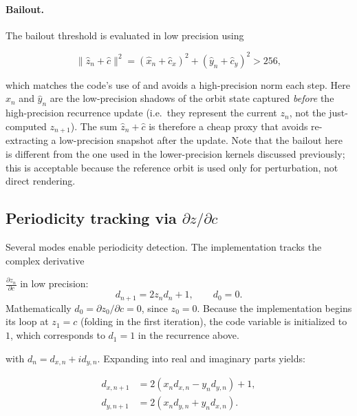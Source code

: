 \paragraph{Bailout.}

The bailout threshold is evaluated in low precision using

\begin{equation}
  \|\hat{z}_n + \hat{c}\|^2 = (\hat{x}_n + \hat{c}_x)^2 + (\hat{y}_n + \hat{c}_y)^2 > 256,
\end{equation}

which matches the code's use of  and avoids a high-precision
norm each step.  Here \(\hat{x}_n\) and \(\hat{y}_n\) are the low-precision
shadows of the orbit state captured \emph{before} the high-precision recurrence
update (i.e.\ they represent the current \(z_n\), not the just-computed
\(z_{n+1}\)).  The sum \(\hat{z}_n + \hat{c}\) is therefore a cheap proxy that
avoids re-extracting a low-precision snapshot after the update.
Note that the bailout here is different from the one used in
the lower-precision kernels discussed previously; this is acceptable because the
reference orbit is used only for perturbation, not direct rendering.

\subsection{Periodicity tracking via \texorpdfstring{$\partial z/\partial c$}{dz/dc}}
\label{subsec:ref-orbit-periodicity}

Several modes enable periodicity detection. The implementation tracks the complex derivative

\(\frac{\partial z_n}{\partial c}\) in low precision:
\begin{equation}
  d_{n+1} = 2 z_n d_n + 1,\qquad d_0 = 0.
\end{equation}
Mathematically \(d_0 = \partial z_0/\partial c = 0\), since \(z_0=0\).
Because the implementation begins its loop at \(z_1=c\) (folding in the
first iteration), the code variable  is initialized to~$1$,
which corresponds to \(d_1=1\) in the recurrence above.

with \(d_n = d_{x,n} + i d_{y,n}\). Expanding into real and imaginary parts yields:

\begin{align}
  d_{x,n+1} &= 2(x_n d_{x,n} - y_n d_{y,n}) + 1, \\
  d_{y,n+1} &= 2(x_n d_{y,n} + y_n d_{x,n}).
\end{align}

